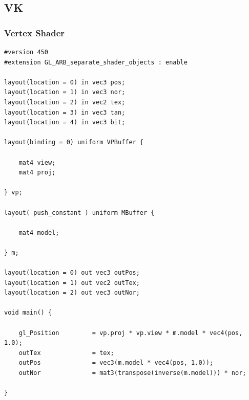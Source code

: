 \documentclass[titlepage, 11pt, a4paper, ngerman]{article}
\begin{document}
\subsection{VK}
\subsubsection{Vertex Shader}
\begin{verbatim}
#version 450
#extension GL_ARB_separate_shader_objects : enable

layout(location = 0) in vec3 pos;
layout(location = 1) in vec3 nor;
layout(location = 2) in vec2 tex;
layout(location = 3) in vec3 tan;
layout(location = 4) in vec3 bit;

layout(binding = 0) uniform VPBuffer {

    mat4 view;
    mat4 proj;

} vp;

layout( push_constant ) uniform MBuffer {

    mat4 model;

} m;

layout(location = 0) out vec3 outPos;
layout(location = 1) out vec2 outTex;
layout(location = 2) out vec3 outNor;

void main() {

    gl_Position         = vp.proj * vp.view * m.model * vec4(pos, 1.0);
    outTex              = tex;
    outPos              = vec3(m.model * vec4(pos, 1.0));
    outNor              = mat3(transpose(inverse(m.model))) * nor;

}
\end{verbatim}
\end{document}
